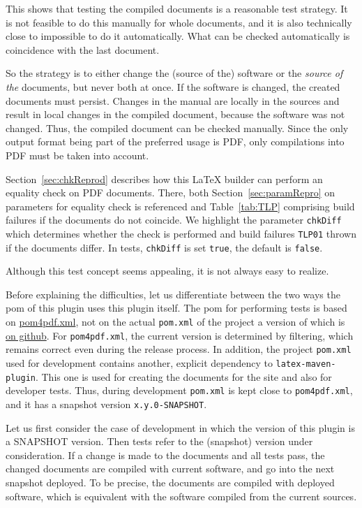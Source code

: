 \documentclass[a4paper,12pt,german,english]{book}
\begin{document}
This shows that testing the compiled documents is a reasonable test strategy. 
It is not feasible to do this manually for whole documents, 
and it is also technically close to impossible to do it automatically. 
What can be checked automatically is coincidence with the last document. 


So the strategy is to either change the (source of the) software 
or the \emph{source of the} documents, but never both at once. 
If the software is changed, the created documents must persist. 
Changes in the manual are locally in the sources 
and result in local changes in the compiled document, 
because the software was not changed. 
Thus, the compiled document can be checked manually. 
Since the only output format being part of the preferred usage is PDF, 
only compilations into PDF must be taken into account. 

Section~\ref{sec:chkReprod} describes how this \LaTeX{} builder 
can perform an equality check on PDF documents. 
There, both Section~\ref{sec:paramRepro} on parameters for equality check is referenced 
and Table~\ref{tab:TLP} comprising build failures if the documents do not coincide. 
We highlight the parameter \texttt{chkDiff} which determines whether the check is performed 
and build failures \texttt{TLP01} thrown if the documents differ. 
In tests, \texttt{chkDiff} is set \texttt{true}, the default is \texttt{false}. 
\medskip


Although this test concept seems appealing, 
it is not always easy to realize. 

Before explaining the difficulties, let us differentiate between the two ways 
the pom of this plugin uses this plugin itself. 
The pom for performing tests 
is based on \href{\urlSite fromMain/pom4pdf.xml}{pom4pdf.xml}, 
not on the actual \texttt{pom.xml} of the project 
a version of which is 
\href{https://github.com/Reissner/latex-maven-plugin/tree/master/maven-latex-plugin}%
{on github}. 
For \texttt{pom4pdf.xml}, the current version is determined by filtering, 
which remains correct even during the release process. 
In addition, the project \texttt{pom.xml} used for development 
contains another, explicit dependency to \texttt{latex-maven-plugin}. 
This one is used for creating the documents for the site 
and also for developer tests. 
Thus, during development \texttt{pom.xml} is kept close to \texttt{pom4pdf.xml}, 
and it has a snapshot version \texttt{x.y.0-SNAPSHOT}. 

Let us first consider the case of development 
in which the version of this plugin is a SNAPSHOT version. 
Then tests refer to the (snapshot) version under consideration. 
If a change is made to the documents and all tests pass, 
the changed documents are compiled with current software, 
and go into the next snapshot deployed. 
To be precise, the documents are compiled with deployed software, 
which is equivalent with the software compiled from the current sources. 
\end{document}
